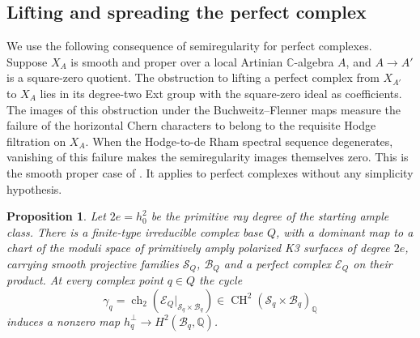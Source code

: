 \documentclass[11pt]{article}
\numberwithin{equation}{section}
\newtheorem{proposition}[theorem]{Proposition}
\theoremstyle{definition}
\theoremstyle{remark}
\newcommand{\Q}{\mathbb Q}
\newcommand{\C}{\mathbb C}
\newcommand{\CH}{\operatorname{CH}}
\newcommand{\ch}{\operatorname{ch}}
\begin{document}
\subsection{Lifting and spreading the perfect complex}

We use the following consequence of semiregularity for perfect
complexes. Suppose $X_A$ is smooth and proper over a local Artinian
$\C$-algebra $A$, and $A\to A'$ is a square-zero quotient. The
obstruction to lifting a perfect complex from $X_{A'}$ to $X_A$
lies in its degree-two Ext group with the square-zero ideal as
coefficients. The images of this obstruction under the
Buchweitz--Flenner maps measure the failure of the horizontal Chern
characters to belong to the requisite Hodge filtration on $X_A$.
When the Hodge-to-de Rham spectral sequence degenerates, vanishing
of this failure makes the semiregularity images themselves zero.
This is the smooth proper case of
\cite[Corollary~2.25 and Remark~2.27]{Deformation:Pridham}.
It applies to perfect complexes without any simplicity hypothesis.

\begin{proposition}\label{prop:dominant-cycle-family}
Let $2e=h_0^2$ be the primitive ray degree of the starting ample
class. There is a finite-type irreducible complex base $Q$, with a
dominant map to a chart of the moduli space of primitively amply
polarized K3 surfaces of degree $2e$, carrying smooth projective
families $\mathcal S_Q$, $\mathcal B_Q$ and a perfect complex
$\mathcal E_Q$ on their product. At every complex point $q\in Q$
the cycle
\[
 \gamma_q=\ch_2(\mathcal E_Q|_{\mathcal S_q\times\mathcal B_q})
      \in\CH^2(\mathcal S_q\times\mathcal B_q)_\Q
\]
induces a nonzero map
$h_q^\perp\to H^2(\mathcal B_q,\Q)$.
\end{proposition}
\end{document}

